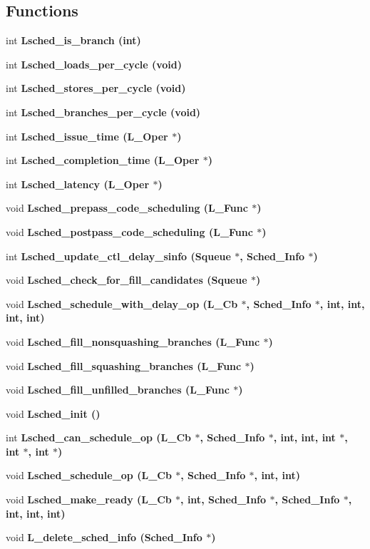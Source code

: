 \subsection*{Functions}
\begin{CompactItemize}
\item 
int \bf{Lsched\_\-is\_\-branch} (int)
\item 
int \bf{Lsched\_\-loads\_\-per\_\-cycle} (void)
\item 
int \bf{Lsched\_\-stores\_\-per\_\-cycle} (void)
\item 
int \bf{Lsched\_\-branches\_\-per\_\-cycle} (void)
\item 
int \bf{Lsched\_\-issue\_\-time} (L\_\-Oper $\ast$)
\item 
int \bf{Lsched\_\-completion\_\-time} (L\_\-Oper $\ast$)
\item 
int \bf{Lsched\_\-latency} (L\_\-Oper $\ast$)
\item 
void \bf{Lsched\_\-prepass\_\-code\_\-scheduling} (L\_\-Func $\ast$)
\item 
void \bf{Lsched\_\-postpass\_\-code\_\-scheduling} (L\_\-Func $\ast$)
\item 
int \bf{Lsched\_\-update\_\-ctl\_\-delay\_\-sinfo} (\bf{Squeue} $\ast$, \bf{Sched\_\-Info} $\ast$)
\item 
void \bf{Lsched\_\-check\_\-for\_\-fill\_\-candidates} (\bf{Squeue} $\ast$)
\item 
void \bf{Lsched\_\-schedule\_\-with\_\-delay\_\-op} (L\_\-Cb $\ast$, \bf{Sched\_\-Info} $\ast$, int, int, int, int)
\item 
void \bf{Lsched\_\-fill\_\-nonsquashing\_\-branches} (L\_\-Func $\ast$)
\item 
void \bf{Lsched\_\-fill\_\-squashing\_\-branches} (L\_\-Func $\ast$)
\item 
void \bf{Lsched\_\-fill\_\-unfilled\_\-branches} (L\_\-Func $\ast$)
\item 
void \bf{Lsched\_\-init} ()
\item 
int \bf{Lsched\_\-can\_\-schedule\_\-op} (L\_\-Cb $\ast$, \bf{Sched\_\-Info} $\ast$, int, int, int $\ast$, int $\ast$, int $\ast$)
\item 
void \bf{Lsched\_\-schedule\_\-op} (L\_\-Cb $\ast$, \bf{Sched\_\-Info} $\ast$, int, int)
\item 
void \bf{Lsched\_\-make\_\-ready} (L\_\-Cb $\ast$, int, \bf{Sched\_\-Info} $\ast$, \bf{Sched\_\-Info} $\ast$, int, int, int)
\item 
void \bf{L\_\-delete\_\-sched\_\-info} (\bf{Sched\_\-Info} $\ast$)

\end{CompactItemize}
